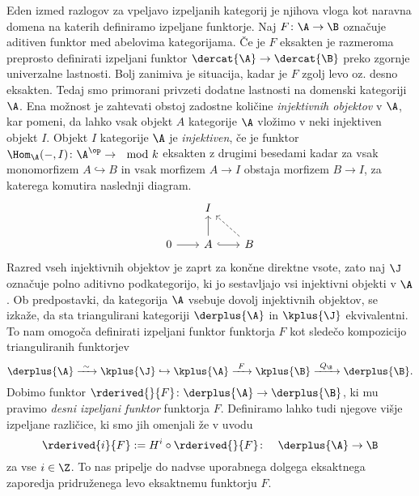 Eden izmed razlogov za vpeljavo izpeljanih kategorij je njihova vloga kot naravna domena na katerih definiramo izpeljane funktorje. Naj $F \colon \A \to \B$ označuje aditiven funktor med abelovima kategorijama. Če je $F$ eksakten je razmeroma preprosto definirati izpeljani funktor $\dercat{\A} \to \dercat{\B}$ preko zgornje univerzalne lastnosti. Bolj zanimiva je situacija, kadar je $F$ zgolj levo oz. desno eksakten. Tedaj smo 
primorani privzeti dodatne lastnosti na domenski kategoriji $\A$. Ena možnost je zahtevati obstoj zadostne količine \emph{injektivnih objektov} v $\A$, kar pomeni, da lahko vsak objekt $A$ kategorije $\A$ vložimo v neki injektiven objekt $I$. Objekt $I$ kategorije $\A$ je \emph{injektiven}, če je funktor $\Hom_\A(-, I) \colon \A^\op \to \mod{k}$ eksakten \oz z drugimi besedami kadar za vsak monomorfizem $A \hookrightarrow B$ in vsak morfizem $A \to I$ obstaja morfizem $B \to I$, za katerega komutira naslednji diagram.
\[\begin{tikzcd}[column sep = 2em]
        & I \\
        0 & A & B
        \arrow[from=2-1, to=2-2]
        \arrow[from=2-2, to=1-2]
        \arrow[hook, from=2-2, to=2-3]
        \arrow[dashed, from=2-3, to=1-2]
    \end{tikzcd}\]
Razred vseh injektivnih objektov je zaprt za končne direktne vsote, zato naj $\J$ označuje polno aditivno podkategorijo, ki jo sestavljajo vsi injektivni objekti v $\A$. Ob predpostavki, da kategorija $\A$ vsebuje dovolj injektivnih objektov, se izkaže, da sta triangulirani kategoriji $\derplus{\A}$ in $\kplus{\J}$ ekvivalentni. To nam omogoča definirati izpeljani funktor funktorja $F$ kot sledečo kompozicijo trianguliranih funktorjev 
\[
    \derplus{\A} \xrightarrow{ \ \sim \ } \kplus{\J} \hookrightarrow \kplus{\A} \xrightarrow{\ F \ } \kplus{\B} \xrightarrow{\ Q_\B \ } \derplus{\B}.
\]
Dobimo funktor $\rderived{}{F} \colon \derplus{\A} \to \derplus{\B}$, ki mu pravimo \emph{desni izpeljani funktor} funktorja $F$. Definiramo lahko tudi njegove višje izpeljane različice, ki smo jih omenjali že v uvodu
\[
    \rderived{i}{F} := H^i \circ \rderived{}{F} \colon \quad \derplus{\A} \to \B
\]
za vse $i \in \Z$. To nas pripelje do nadvse uporabnega dolgega eksaktnega zaporedja pridruženega levo eksaktnemu funktorju $F$.

